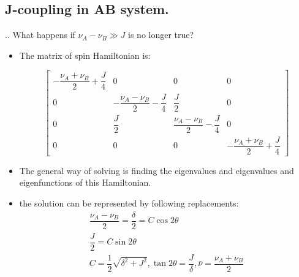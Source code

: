 \documentclass{beamer}
\begin{document}
\subsection{J-coupling in AB system.}
\begin{frame}{\thesection.\thesubsection. \insertsubsection}
	What happens if $\nu_A - \nu_B \gg J$ is no longer true?
	
	\begin{itemize}[<+>]
		\item 
		The matrix of spin Hamiltonian is:
		
			
			{\tiny
				\begin{equation}				
				\begin{bmatrix}
				-\dfrac{\nu_A+ \nu_{B}  }{2} + \dfrac{J}{4}   & 0 & 0 & 0 \\
				0 & -\dfrac{\nu_A-\nu_B}{2} - \dfrac{J}{4}  & \dfrac{J}{2} & 0 \\
				0 & \dfrac{J}{2} & \dfrac{\nu_A-\nu_B}{2} - \dfrac{J}{4}  & 0 \\
				0 & 0 & 0 & -\dfrac{\nu_A+\nu_B}{2} + \dfrac{J}{4}                  
				\end{bmatrix}
				\end{equation}
			}%
		\item The general way of solving is finding the eigenvalues and eigenvalues and eigenfunctions of this Hamiltonian.
		\item
		the solution can be represented by following replacements:
		\begin{equation}
		\begin{array}{l}
		\dfrac{\nu_A - \nu_B}{2} = \dfrac{\delta}{2} = C \cos 2\theta \\
		\dfrac{J}{2} = C \sin 2\theta \\
		C = \dfrac{1}{2}\sqrt{\delta^2 + J^2}, \tan 2\theta = \dfrac{J}{\delta}, \bar{\nu} = \dfrac{\nu_A + \nu_B}{2}
		\end{array}
		\end{equation}
	\end{itemize}
\end{frame}
\end{document}

